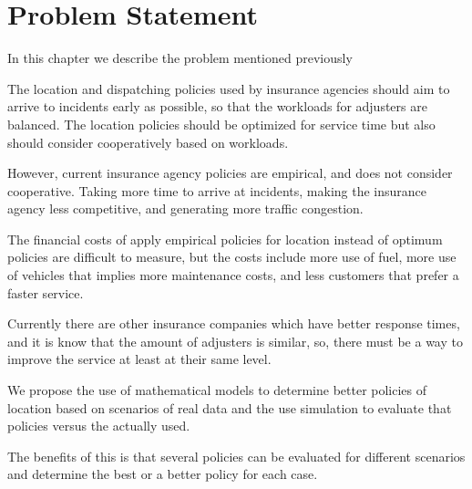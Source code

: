 \chapter{Problem Statement}
In this chapter we describe the problem
mentioned previously

The location and dispatching policies
used by insurance agencies
should aim
to arrive to incidents
early as possible,
so that
the workloads for adjusters are balanced.
The location policies
should be optimized for service time
but also should consider
cooperatively
based on workloads.

However,
current insurance agency policies
are empirical,
and does not consider cooperative.
Taking more time to arrive at incidents,
making the insurance agency
less competitive,
and generating more traffic congestion.

The financial costs
of apply
empirical policies for location
instead of optimum policies
are difficult to measure,
but the costs include
more use of fuel,
more use of vehicles
that implies
more maintenance costs,
and less customers
that prefer a faster service.

Currently
there are other
insurance companies
which have
better response times,
and
it is know
that the amount of adjusters
is similar,
so,
there must be
a way to improve the service
at least at their same level.

We propose
the use of mathematical models
to determine better policies of location
based on scenarios
of real data
and the use simulation
to evaluate that policies
versus the actually used.

The benefits of this
is that several policies
can be evaluated
for different scenarios
and
determine the best or a better policy
for each case.

